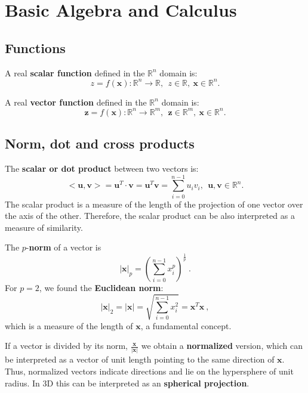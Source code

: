 
\section{Basic Algebra and Calculus}

\subsection{Functions}

A real \textbf{scalar function} defined in the $\mathbb{R}^n$ domain is:
\begin{equation}
 z=f(\mathbf{x}):\mathbb{R}^n \rightarrow \mathbb{R}, 
 \ \ z \in \mathbb{R}, \ \mathbf{x} \in \mathbb{R}^n.
\end{equation}

A real \textbf{vector function} defined in the $\mathbb{R}^n$ domain is:
\begin{equation}
 \mathbf{z}=f(\mathbf{x}):\mathbb{R}^n \rightarrow \mathbb{R}^m, 
 \ \ \mathbf{z} \in \mathbb{R}^m, \ \mathbf{x} \in \mathbb{R}^n.
\end{equation}

\subsection{Norm, dot and cross products }

The \textbf{scalar or dot product} between two vectors is:
\begin{equation}
<\mathbf{u},\mathbf{v}> = \mathbf{u}^T \cdot \mathbf{v} = \mathbf{u}^T \mathbf{v} = \sum_{i=0}^{n-1} u_{i} v_{i}
, \ \ \mathbf{u},\mathbf{v} \in \mathbb{R}^n.
\end{equation}
The scalar product is a measure of the length of the projection of one vector over the axis of the other. 
Therefore, the scalar product can be also interpreted as a measure of similarity.

The $p$-\textbf{norm} of a vector is 
\begin{equation}
 \vert \mathbf{x} \vert _p = ( \sum_{i=0}^{n-1} x_{i}^p )^{\frac{1}{p}} \ .
\end{equation}
For $p = 2$, we found the \textbf{Euclidean norm}:
\begin{equation}
 \vert \mathbf{x} \vert _2 = \vert \mathbf{x} \vert = \sqrt{\sum_{i=0}^{n-1} x_{i}^2} = \mathbf{x}^T \mathbf{x}\ ,
\end{equation}
which is a measure of the length of $\mathbf{x}$, a fundamental concept.

If a vector is divided by its norm, $\frac{\mathbf{x}}{ \vert \mathbf{x} \vert }$ we obtain a \textbf{normalized} version, which can be interpreted as a vector of unit length pointing to the same direction of $\mathbf{x}$. Thus, normalized vectors indicate directions and lie on the hypersphere of unit radius. In 3D this can be interpreted as an \textbf{spherical projection}.

